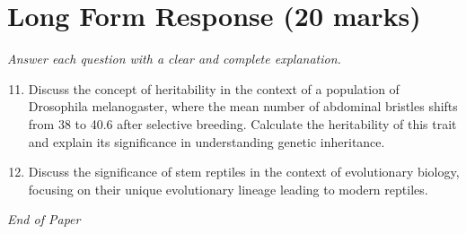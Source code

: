 \documentclass[12pt]{article}
\begin{document}
\section*{Long Form Response (20 marks)}
\textit{Answer each question with a clear and complete explanation.}
\begin{enumerate}[label=\arabic*.]
\setcounter{enumi}{10}
\item Discuss the concept of heritability in the context of a population of Drosophila melanogaster, where the mean number of abdominal bristles shifts from 38 to 40.6 after selective breeding. Calculate the heritability of this trait and explain its significance in understanding genetic inheritance.
\item Discuss the significance of stem reptiles in the context of evolutionary biology, focusing on their unique evolutionary lineage leading to modern reptiles.
\end{enumerate}

\vfill
\noindent\textit{End of Paper}
\end{document}
